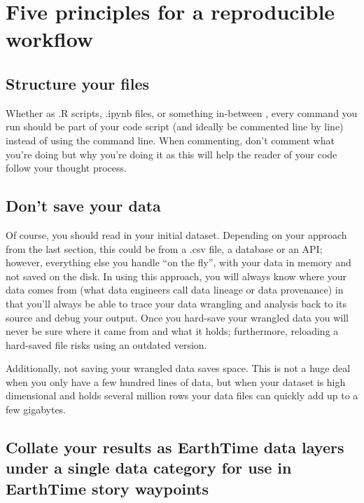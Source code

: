 \documentclass[
]{book}
\begin{document}
\hypertarget{five-principles-for-a-reproducible-workflow}{%
\section{Five principles for a reproducible workflow}\label{five-principles-for-a-reproducible-workflow}}

\hypertarget{structure-your-files}{%
\subsection*{Structure your files}\label{structure-your-files}}


Whether as .R scripts, .ipynb files, or something in-between , every command you run should be part of your code script (and ideally be commented line by line) instead of using the command line. When commenting, don't comment what you're doing but why you're doing it as this will help the reader of your code follow your thought process.

\hypertarget{dont-save-your-data}{%
\subsection*{Don't save your data}\label{dont-save-your-data}}


Of course, you should read in your initial dataset. Depending on your approach from the last section, this could be from a .csv file, a database or an API; however, everything else you handle ``on the fly'', with your data in memory and not saved on the disk. In using this approach, you will always know where your data comes from (what data engineers call data lineage or data provenance) in that you'll always be able to trace your data wrangling and analysis back to its source and debug your output. Once you hard-save your wrangled data you will never be sure where it came from and what it holds; furthermore, reloading a hard-saved file risks using an outdated version.

Additionally, not saving your wrangled data saves space. This is not a huge deal when you only have a few hundred lines of data, but when your dataset is high dimensional and holds several million rows your data files can quickly add up to a few gigabytes.

\hypertarget{collate-your-results-as-earthtime-data-layers-under-a-single-data-category-for-use-in-earthtime-story-waypoints}{%
\subsection*{Collate your results as EarthTime data layers under a single data category for use in EarthTime story waypoints}\label{collate-your-results-as-earthtime-data-layers-under-a-single-data-category-for-use-in-earthtime-story-waypoints}}
\end{document}
